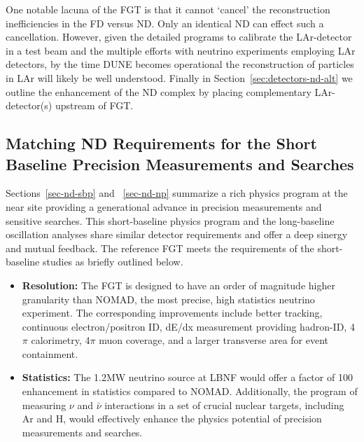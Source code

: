One notable lacuna of the FGT is that it cannot `cancel' the reconstruction inefficiencies in the FD versus ND. 
Only an identical ND can effect such a cancellation. However, given the detailed programs to calibrate the LAr-detector 
in a test beam and the multiple efforts with neutrino experiments employing LAr detectors, by the time DUNE 
becomes operational the reconstruction of particles in LAr will likely be well understood. Finally in 
Section~\ref{sec:detectors-nd-alt} we outline the enhancement of the ND complex by placing 
complementary LAr-detector(s) upstream of FGT. 



\subsection{Matching ND Requirements for the Short Baseline Precision Measurements and Searches} 
\label{cdrsec:detectors-nd-ref-fgt-req-sbp}


Sections~\ref{sec-nd-sbp} and ~\ref{sec-nd-np} summarize a rich physics program at the near site 
providing a generational advance in precision measurements and sensitive searches. 
This short-baseline physics program and the long-baseline oscillation analyses  
share similar detector requirements and offer a deep sinergy and mutual feedback.  
The reference FGT meets the requirements of the short-baseline studies as briefly outlined below. 

\begin{itemize}
    \item {\bf Resolution:} The FGT is designed to have an order of magnitude higher granularity than NOMAD, 
    the most precise, high statistics neutrino experiment. The corresponding improvements include better tracking, 
    continuous electron/positron ID, dE/dx measurement providing hadron-ID, 4$\pi$ calorimetry,
     4$\pi$ muon coverage, and a larger transverse area for event containment. 
    
    \item {\bf Statistics:} The 1.2MW neutrino source at LBNF would offer a factor of 100 enhancement in statistics 
    compared to NOMAD. Additionally, the program of measuring $\nu$ and $\bar\nu$ interactions 
    in a set of crucial nuclear targets, including Ar and H, would effectively enhance the physics potential 
    of precision measurements and searches.  

                 
\end{itemize}

